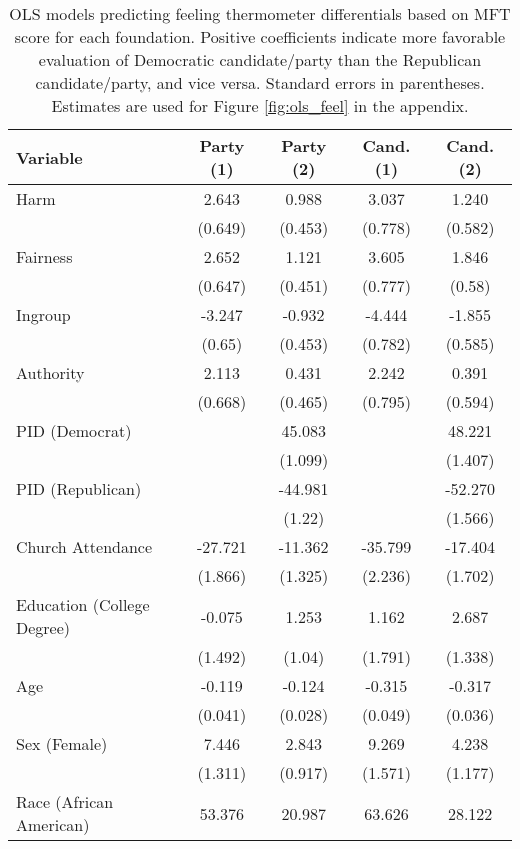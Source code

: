 \begin{table}[h]
\centering
\caption{OLS models predicting feeling thermometer differentials based on
           MFT score for each foundation. Positive coefficients indicate more favorable evaluation 
           of Democratic candidate/party than the Republican candidate/party, and vice versa. 
           Standard errors in parentheses. Estimates are used for Figure \ref{fig:ols_feel} 
           in the appendix.} 
\label{tab:ols_feel}
\begingroup\footnotesize
\begin{tabular}{lcccc}
  \hline
Variable & Party (1) & Party (2) & Cand. (1) & Cand. (2) \\ 
  \hline
Harm &   2.643 &   0.988 &   3.037 &   1.240 \\ 
   & (0.649) & (0.453) & (0.778) & (0.582) \\ 
  Fairness &   2.652 &   1.121 &   3.605 &   1.846 \\ 
   & (0.647) & (0.451) & (0.777) & (0.58) \\ 
  Ingroup &  -3.247 &  -0.932 &  -4.444 &  -1.855 \\ 
   & (0.65) & (0.453) & (0.782) & (0.585) \\ 
  Authority &   2.113 &   0.431 &   2.242 &   0.391 \\ 
   & (0.668) & (0.465) & (0.795) & (0.594) \\ 
  PID (Democrat) &  &  45.083 &  &  48.221 \\ 
   &  & (1.099) &  & (1.407) \\ 
  PID (Republican) &  & -44.981 &  & -52.270 \\ 
   &  & (1.22) &  & (1.566) \\ 
  Church Attendance & -27.721 & -11.362 & -35.799 & -17.404 \\ 
   & (1.866) & (1.325) & (2.236) & (1.702) \\ 
  Education (College Degree) &  -0.075 &   1.253 &   1.162 &   2.687 \\ 
   & (1.492) & (1.04) & (1.791) & (1.338) \\ 
  Age &  -0.119 &  -0.124 &  -0.315 &  -0.317 \\ 
   & (0.041) & (0.028) & (0.049) & (0.036) \\ 
  Sex (Female) &   7.446 &   2.843 &   9.269 &   4.238 \\ 
   & (1.311) & (0.917) & (1.571) & (1.177) \\ 
  Race (African American) &  53.376 &  20.987 &  63.626 &  28.122 \\ 

\end{tabular}
\end{table}

